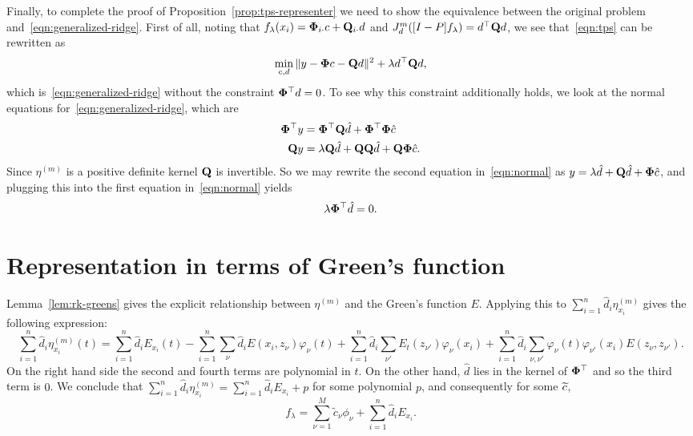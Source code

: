 \documentclass{article}
\begin{document}
Finally, to complete the proof of Proposition~\ref{prop:tps-representer} we need to show the equivalence between the original problem and~\eqref{eqn:generalized-ridge}. First of all, noting that $f_{\lambda}(x_i) = {\bf \Phi}_{i\cdot} c + {\bf Q}_{i \cdot} d$ and $J_d^{m}([I - P]f_{\lambda}) = d^{\top} {\bf Q} d$,  we see that~\eqref{eqn:tps} can be rewritten as 
\begin{equation*}
\min_{c,d} \|y - {\bf \Phi} c - {\bf Q} d\|^2 + \lambda d^{\top} {\bf Q} d,
\end{equation*}
which is~\eqref{eqn:generalized-ridge} without the constraint ${\bf \Phi}^{\top}d = 0$. To see why this constraint additionally holds, we look at the normal equations for~\eqref{eqn:generalized-ridge}, which are
\begin{equation}
	\label{eqn:normal}
	\begin{aligned}
	{\bf \Phi}^{\top} y &=  {\bf \Phi}^{\top} {\bf Q} \hat{d} + {\bf \Phi}^{\top} {\bf \Phi} \hat{c} \\
	{\bf Q} y & = \lambda {\bf Q} \hat{d}  + {\bf Q}{\bf Q} \hat{d} + {\bf Q} {\bf \Phi} \hat{c}.
	\end{aligned}
\end{equation}
Since $\eta^{(m)}$ is a positive definite kernel ${\bf Q}$ is invertible. So we may rewrite the second equation in~\eqref{eqn:normal} as $y = \lambda \hat{d} + {\bf Q} \hat{d} + {\bf \Phi} \hat{c}$, and plugging this into the first equation in~\eqref{eqn:normal} yields
\begin{equation*}
	\lambda {\bf \Phi}^{\top} \hat{d} = 0.
\end{equation*}

\section{Representation in terms of Green's function}
Lemma~\ref{lem:rk-greens} gives the explicit relationship between $\eta^{(m)}$ and the Green's function $E$. Applying this to $\sum_{i = 1}^{n} \hat{d}_i \eta_{x_i}^{(m)}$ gives the following expression:
\begin{equation*}
	\sum_{i = 1}^{n} \hat{d}_i \eta_{x_i}^{(m)}(t) = \sum_{i = 1}^{n} \hat{d}_i E_{x_i}(t) - \sum_{i = 1}^{n} \sum_{\nu} \hat{d}_i E(x_i,z_{\nu}) \varphi_{\nu}(t) + \sum_{i = 1}^{n} \hat{d}_i \sum_{\nu'} E_{t}(z_{\nu'}) \varphi_{\nu}(x_i) + \sum_{i = 1}^{n} \hat{d}_i \sum_{\nu,\nu'} \varphi_{\nu}(t) \varphi_{\nu'}(x_i) E(z_{\nu},z_{\nu'}).
\end{equation*}
On the right hand side the second and fourth terms are polynomial in $t$. On the other hand, $\hat{d}$ lies in the kernel of ${\bf \Phi}^{\top}$ and so the third term is $0$. We conclude that $\sum_{i = 1}^{n} \hat{d}_i \eta_{x_i}^{(m)} = \sum_{i = 1}^{n} \hat{d}_i E_{x_i} + p$ for some polynomial $p$, and consequently for some $\widetilde{c}$,
\begin{equation}
	\label{pf:thm1-1}
	f_{\lambda} = \sum_{\nu = 1}^{M} \tilde{c}_{\nu} \phi_{\nu} + \sum_{i = 1}^{n} \hat{d}_i E_{x_i}.
\end{equation}
\end{document}
